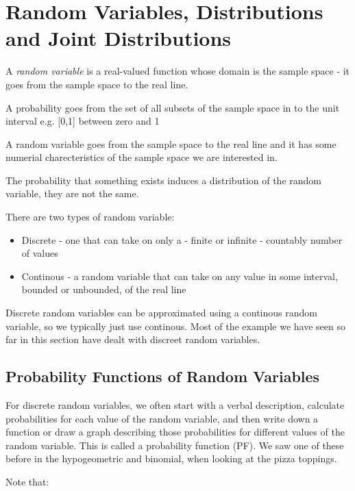 \documentclass[]{book}
\providecommand{\tightlist}{%
  \setlength{\itemsep}{0pt}\setlength{\parskip}{0pt}}
\theoremstyle{definition}
\theoremstyle{definition}
\theoremstyle{definition}
\theoremstyle{remark}
\begin{document}
\section{Random Variables, Distributions and Joint
Distributions}\label{random-variables-distributions-and-joint-distributions}

A \emph{random variable} is a real-valued function whose domain is the
sample space - it goes from the sample space to the real line.

A probability goes from the set of all subsets of the sample space in to
the unit interval e.g. {[}0,1{]} between zero and 1

A random variable goes from the sample space to the real line and it has
some numerial charecteristics of the sample space we are interested in.

The probability that something exists induces a distribution of the
random variable, they are not the same.

There are two types of random variable:

\begin{itemize}
\tightlist
\item
  Discrete - one that can take on only a - finite or infinite -
  countably number of values
\item
  Continous - a random variable that can take on any value in some
  interval, bounded or unbounded, of the real line
\end{itemize}

Discrete random variables can be approximated using a continous random
variable, so we typically just use continous. Most of the example we
have seen so far in this section have dealt with discreet random
variables.

\subsection{Probability Functions of Random
Variables}\label{probability-functions-of-random-variables}

For discrete random variables, we often start with a verbal description,
calculate probabilities for each value of the random variable, and then
write down a function or draw a graph describing those probabilities for
different values of the random variable. This is called a probability
function (PF). We saw one of these before in the hypogeometric and
binomial, when looking at the pizza toppings.

Note that:
\end{document}
